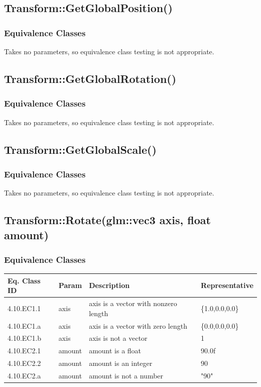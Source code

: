 \documentclass[11pt]{article}
\begin{document}
\clearpage
\subsection{Transform::GetGlobalPosition()}
\label{sec:orgbc7eb80}
\subsubsection*{Equivalence Classes}
\label{sec:orged14dfe}
Takes no parameters, so equivalence class testing is not appropriate.
\subsection{Transform::GetGlobalRotation()}
\label{sec:orgc216cd3}
\subsubsection*{Equivalence Classes}
\label{sec:orgacec553}
Takes no parameters, so equivalence class testing is not appropriate.
\subsection{Transform::GetGlobalScale()}
\label{sec:orgc3b7417}
\subsubsection*{Equivalence Classes}
\label{sec:orgd6e0f09}
Takes no parameters, so equivalence class testing is not appropriate.

\clearpage
\subsection{Transform::Rotate(glm::vec3 axis, float amount)}
\label{sec:orgde370c7}
\subsubsection*{Equivalence Classes}
\label{sec:org28cd6cc}
\begin{center}
\begin{tabularx}{\textwidth}{lXXX}
\hline
\textbf{Eq. Class ID} & \textbf{Param} & \textbf{Description} & \textbf{Representative}\\
\hline
4.10.EC1.1 & axis & axis is a vector with nonzero length & \{1.0,0.0,0.0\}\\
\hline
4.10.EC1.a & axis & axis is a vector with zero length & \{0.0,0.0,0.0\}\\
\hline
4.10.EC1.b & axis & axis is not a vector & 1\\
\hline
4.10.EC2.1 & amount & amount is a float & 90.0f\\
\hline
4.10.EC2.2 & amount & amount is an integer & 90\\
\hline
4.10.EC2.a & amount & amount is not a number & "90"\\
\hline
\end{tabularx}
\end{center}
\end{document}
